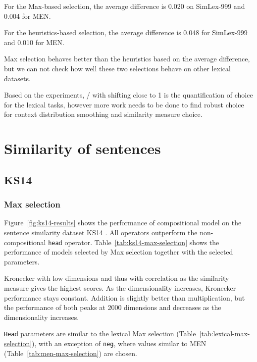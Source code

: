 For the Max-based selection, the average difference is 0.020 on SimLex-999 and 0.004 for MEN.

For the heuristics-based selection, the average difference is 0.048 for SimLex-999 and 0.010 for MEN.

Max selection behaves better than the heuristics based on the average difference, but we can not check how well these two selections behave on other lexical datasets.

Based on the experiments, \logNSCPMI/ with shifting close to 1 is the quantification of choice for the lexical tasks, however more work needs to be done to find robust choice for context distribution smoothing and similarity measure choice.

\chapter{Similarity of sentences}
\label{sec:sentential}


\section{KS14}
\label{sec:ks14}

\subsection{Max selection}
\label{sec:max-selection-ks14}



Figure~\ref{fig:ks14-results} shows the performance of compositional model on the sentence similarity dataset KS14 \cite{kartsadrqpl2014}.
All operators outperform the non-compositional \texttt{head} operator. Table~\ref{tab:ks14-max-selection} shows the performance of models selected by Max selection together with the selected parameters.

Kronecker with low dimensions and thus with correlation as the similarity measure gives the highest scores. As the dimensionality increases, Kronecker performance stays constant. Addition is slightly better than multiplication, but the performance of both peaks at 2000 dimensions and decreases as the dimensionality increases.

\texttt{Head} parameters are similar to the lexical Max selection (Table~\ref{tab:lexical-max-selection}), with an exception of \texttt{neg}, where values similar to MEN (Table~\ref{tab:men-max-selection}) are chosen.

